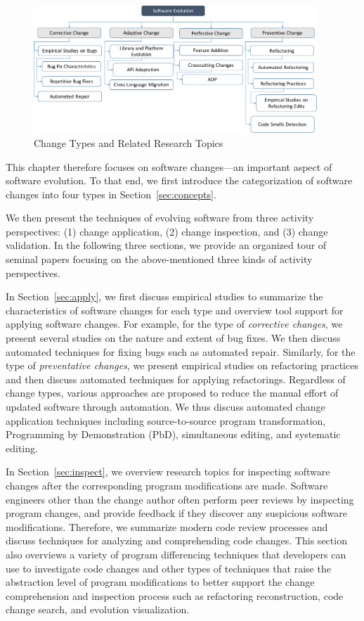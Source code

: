 \documentclass[runningheads,a4paper]{llncs}
\begin{document}
\begin{figure}[ht]
 \centering
 \includegraphics[width=0.95\textwidth]{images/ChangeTypesTopics.pdf}
 \caption{Change Types and Related Research Topics} 
 \label{fig:changetypetopic}
\end{figure}

This chapter therefore focuses on software changes---an important aspect of software evolution. To that end, we first introduce the categorization of software changes into four types in Section~\ref{sec:concepts}. 

We then present the techniques of evolving software from three activity perspectives: (1) change application, (2) change inspection, and (3) change validation. In the following three sections, we provide an organized tour of seminal papers focusing on the above-mentioned three kinds of activity perspectives. 

In Section~\ref{sec:apply}, we first discuss empirical studies to summarize the characteristics of software changes for each type and overview tool support for applying software changes. For example, for the type of {\em corrective changes}, we present several studies on the nature and extent of bug fixes. We then discuss automated techniques for fixing bugs such as automated repair. Similarly, for the type of {\em preventative changes}, we present empirical studies on refactoring practices and then discuss automated techniques for applying refactorings.  Regardless of change types, various approaches are proposed to reduce the manual effort of updated software through automation. We thus discuss automated change application techniques including source-to-source program transformation, Programming by Demonstration (PbD), simultaneous editing, and systematic editing.

In Section~\ref{sec:inspect}, we overview research topics for inspecting software changes after the corresponding program modifications are made. Software engineers other than the change author often perform peer reviews by inspecting program changes, and provide feedback if they discover any suspicious software modifications. Therefore, we summarize modern code review processes and discuss techniques for analyzing and comprehending code changes. This section also overviews a variety of program differencing techniques that developers can use to investigate code changes and other types of techniques that raise the abstraction level of program modifications to better support the change comprehension and inspection process such as refactoring reconstruction, code change search, and evolution visualization. 
\end{document}
